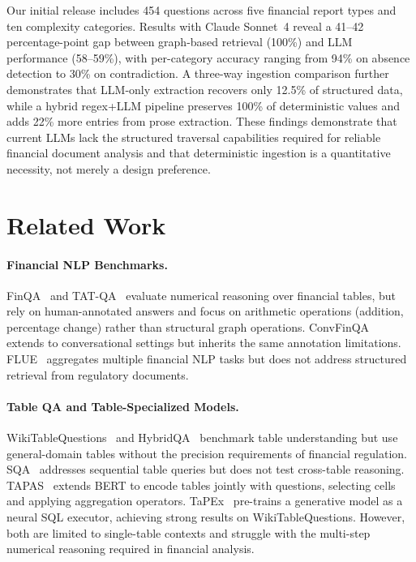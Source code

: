 \documentclass[11pt]{article}
\begin{document}
Our initial release includes 454 questions across five financial report
types and ten complexity categories.  Results with Claude Sonnet~4 reveal a
41--42 percentage-point gap between graph-based retrieval (100\%) and LLM
performance (58--59\%), with per-category accuracy ranging from 94\% on
absence detection to 30\% on contradiction.  A three-way ingestion
comparison further demonstrates that LLM-only extraction recovers only
12.5\% of structured data, while a hybrid regex+LLM pipeline preserves
100\% of deterministic values and adds 22\% more entries from prose
extraction.  These findings demonstrate that current LLMs lack the
structured traversal capabilities required for reliable financial
document analysis and that deterministic ingestion is a quantitative
necessity, not merely a design preference.

\section{Related Work}
\label{sec:related}

\paragraph{Financial NLP Benchmarks.}
FinQA~\citep{chen2021finqa} and TAT-QA~\citep{zhu2021tat} evaluate numerical
reasoning over financial tables, but rely on human-annotated answers and focus
on arithmetic operations (addition, percentage change) rather than structural
graph operations.  ConvFinQA~\citep{chen2022convfinqa} extends to
conversational settings but inherits the same annotation limitations.
FLUE~\citep{shah2022flue} aggregates multiple financial NLP tasks but does not
address structured retrieval from regulatory documents.

\paragraph{Table QA and Table-Specialized Models.}
WikiTableQuestions~\citep{pasupat2015compositional} and
HybridQA~\citep{chen2020hybridqa} benchmark table understanding but use
general-domain tables without the precision requirements of financial
regulation.  SQA~\citep{iyyer2017search} addresses sequential table queries
but does not test cross-table reasoning.
TAPAS~\citep{herzig2020tapas} extends BERT to encode tables jointly with
questions, selecting cells and applying aggregation operators.
TaPEx~\citep{liu2022tapex} pre-trains a generative model as a neural SQL
executor, achieving strong results on WikiTableQuestions.
However, both are limited to single-table contexts and struggle with the
multi-step numerical reasoning required in financial analysis.
\end{document}
